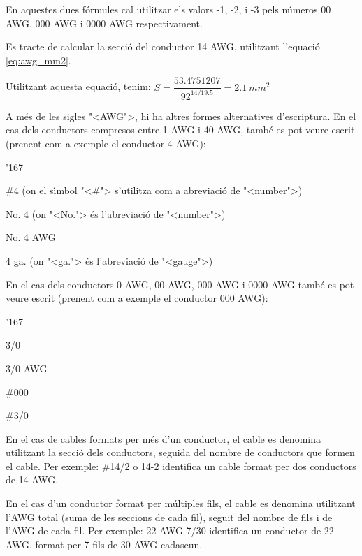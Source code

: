 En aquestes dues f\'{o}rmules cal utilitzar els valors -1, -2, i -3  pels n\'{u}meros 00 AWG,
000 AWG i 0000 AWG respectivament.


\begin{exemple}
    Es tracte de calcular la secci\'{o} del conductor 14 AWG, utilitzant l'equaci\'{o} \eqref{eq:awg_mm2}.

    Utilitzant aquesta equaci\'{o}, tenim:
    $S = \dfrac{\num{53,4751207}}{92^{\text{14}/\num{19,5}}} = \SI{2,1}{mm^2}$
\end{exemple}


A m\'{e}s de les sigles {"<}AWG{">}, hi ha altres formes alternatives d'escriptura. En el cas dels conductors compresos entre 1 AWG i 40 AWG, tamb\'{e} es pot veure escrit (prenent com a exemple el conductor 4 AWG):
\begin{dinglist}{'167}
   \item \#4 (on el s\'{\i}mbol {"<}\#{">} s'utilitza com a abreviaci\'{o} de {"<}number{">})
   \item No. 4 (on {"<}No.{">} \'{e}s l'abreviaci\'{o} de {"<}number{">})
   \item No. 4 AWG
   \item 4 ga. (on {"<}ga.{">} \'{e}s l'abreviaci\'{o} de {"<}gauge{">})
\end{dinglist}

En el cas dels conductors 0 AWG, 00 AWG, 000 AWG i 0000 AWG tamb\'{e} es pot veure escrit (prenent com a exemple el conductor 000 AWG):
\begin{dinglist}{'167}
   \item 3/0
   \item 3/0 AWG
   \item \#000
   \item \#3/0
\end{dinglist}
\break

En el cas de cables formats per m\'{e}s d'un conductor, el cable es denomina utilitzant la secci\'{o} dels conductors, seguida del nombre de conductors que formen el cable. Per exemple: \#14/2 o 14-2 identifica un cable format per dos conductors de 14 AWG.

En el cas d'un conductor format per m\'{u}ltiples fils, el cable es denomina utilitzant l'AWG total (suma de les seccions de cada fil), seguit del nombre de fils i de l'AWG de cada fil. Per exemple: 22 AWG 7/30 identifica un conductor de 22 AWG, format per 7 fils de  30 AWG cadascun.

